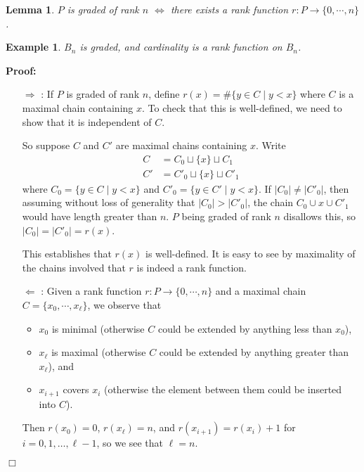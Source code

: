 \documentclass[11pt]{article}
\newtheorem{lemma}[theorem]{Lemma}
\newtheorem{example}[theorem]{Example}
\newenvironment{proof}{\noindent \textbf{Proof:}}{$\Box$}
\begin{document}
\begin{lemma}
    $P$ is graded of rank $n$ $\iff$ there exists a rank function
    $r: P \to \{0,\cdots,n\}$.
\end{lemma}
\begin{example}
    $B_n$ is graded, and cardinality is a rank function on $B_n$.
\end{example}
\begin{proof}
    \begin{itemize}
        \item[$\Rightarrow$ :]
            If $P$ is graded of rank $n$, define
            $r(x) = \#\{ y \in C \mid y < x \}$
            where $C$ is a maximal chain containing $x$. To check that this is
            well-defined, we need to show that it is independent of $C$.

            So suppose $C$ and $C'$ are maximal chains containing $x$.  Write
            \begin{align*}
                C &= C_0 \sqcup \{x\} \sqcup C_1 \\
                C' &= C'_0 \sqcup \{x\} \sqcup C'_1
            \end{align*}
            where $C_0 = \{y \in C \mid y<x\}$ and $C'_0 = \{y \in C' \mid y<x\}$.
            If $|C_0| \neq |C'_0|$, then assuming without loss of generality
            that $|C_0| > |C'_0|$, the chain $C_0 \cup x \cup C'_1$
            would have length greater than $n$. $P$ being graded of rank $n$
            disallows this, so $|C_0| = |C'_0| = r(x)$.

            This establishes that $r(x)$ is well-defined.
            It is easy to see by maximality of the chains involved
            that $r$ is indeed a rank function.
        \item[$\Leftarrow$ :]
            Given a rank function $r: P \to \{0,\cdots,n\}$
            and a maximal chain $C = \{x_0,\cdots,x_\ell\}$, we observe that
            \begin{itemize}
                \item $x_0$ is minimal (otherwise $C$ could be extended by
                    anything less than $x_0$),
                \item $x_\ell$ is maximal (otherwise $C$ could be extended
                    by anything greater than $x_\ell$), and
                \item $x_{i+1}$ covers $x_i$ (otherwise the element between
                    them could be inserted into $C$).
            \end{itemize}
            Then $r(x_0) = 0$, $r(x_\ell) = n$, and $r(x_{i+1}) = r(x_i) + 1$ for $i=0,1,\ldots,\ell-1$,
            so we see that $\ell = n$.
    \end{itemize}
\end{proof}
\end{document}
